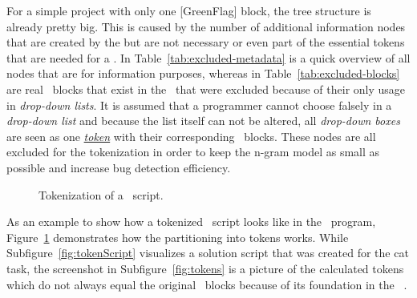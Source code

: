 For a simple \scratch{} project with only one [GreenFlag] block, the tree structure is already pretty big. This is caused by the number of additional information nodes that are created by the \litterbox{} \AST{} but are not necessary or even part of the essential tokens that are needed for a \ngram{}. In Table~\ref{tab:excluded-metadata} is a quick overview of all  nodes that are for information purposes, whereas in Table~\ref{tab:excluded-blocks} are real \scratch\ blocks that exist in the \AST\ that were excluded because of their only usage in \textit{drop-down lists}. It is assumed that a programmer cannot choose falsely in a \textit{drop-down list} and because the list itself can not be altered, all \textit{drop-down boxes} are seen as one  \hyperref[def:token]{\textit{token}} with their corresponding \scratch\ blocks. These nodes are all excluded for the tokenization in order to keep the n-gram model as small as possible and increase bug detection efficiency.  

\begin{figure}%
    \centering
    \qquad
    \caption[Tokenization of a \scratch\ script]{\label{fig:tokenization}Tokenization of a \scratch\ script.}%
\end{figure}

As an example to show how a tokenized \scratch\ script looks like in the \tokenizer\ program, Figure~\ref{fig:tokenization} demonstrates how the partitioning into tokens works. While Subfigure~\ref{fig:tokenScript} visualizes a solution script that was created for the cat task, the screenshot in Subfigure~\ref{fig:tokens} is a picture of the calculated tokens which do not always equal the original \scratch\ blocks because of its foundation in the \litterbox\ \AST{}. 

